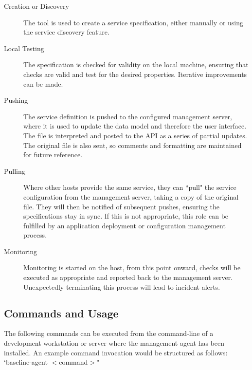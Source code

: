 \documentclass{cshonours}
\begin{document}
\begin{description}
  \item[Creation or Discovery] The tool is used to create a service specification, either manually or using the service discovery feature.
  \item[Local Testing] The specification is checked for validity on the local machine, ensuring that checks are valid and test for the desired properties. Iterative improvements can be made.
  \item[Pushing] The service definition is pushed to the configured management server, where it is used to update the data model and therefore the user interface. The file is interpreted and posted to the API as a series of partial updates. The original file is also sent, so comments and formatting are maintained for future reference.
  \item[Pulling] Where other hosts provide the same service, they can ``pull" the service configuration from the management server, taking a copy of the original file. They will then be notified of subsequent pushes, ensuring the specifications stay in sync. If this is not appropriate, this role can be fulfilled by an application deployment or configuration management process.
  \item[Monitoring] Monitoring is started on the host, from this point onward, checks will be executed as appropriate and reported back to the management server. Unexpectedly terminating this process will lead to incident alerts.
\end{description}

\subsection{Commands and Usage}

The following commands can be executed from the command-line of a development workstation or server where the management agent has been installed. An example command invocation would be structured as follows: `baseline-agent $<$command$>$"
\end{document}
